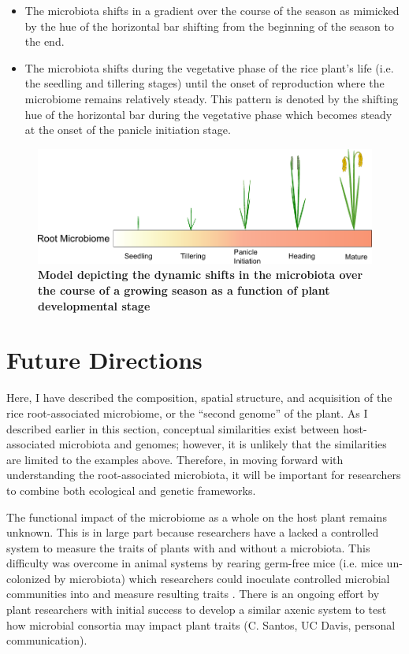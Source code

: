 \begin{itemize}
\item The microbiota shifts in a gradient over the course of the season as mimicked by the hue of the horizontal bar shifting from the beginning of the season to the end.
\item The microbiota shifts during the vegetative phase of the rice plant's life (i.e. the seedling and tillering stages) until the onset of reproduction where the microbiome remains relatively steady. This pattern is denoted by the shifting hue of the horizontal bar during the vegetative phase which becomes steady at the onset of the panicle initiation stage.
\end{itemize}

\begin{figure}[h]
\centering
\includegraphics[width=5in]{Figures/figurec_3}
\caption[Figure 5.3]{\textbf{Model depicting the dynamic shifts in the microbiota over the course of a growing season as a function of plant developmental stage}}
\label{Figure 5.3}
\end{figure}

\section{Future Directions}
Here, I have described the composition, spatial structure, and acquisition of the rice root-associated microbiome, or the ``second genome'' of the plant. As I described earlier in this section, conceptual similarities exist between host-associated microbiota and genomes; however, it is unlikely that the similarities are limited to the examples above. Therefore, in moving forward with understanding the root-associated microbiota, it will be important for researchers to combine both ecological and genetic frameworks.

The functional impact of the microbiome as a whole on the host plant remains unknown. This is in large part because researchers have a lacked a controlled system to measure the traits of plants with and without a microbiota. This difficulty was overcome in animal systems by rearing germ-free mice (i.e. mice un-colonized by microbiota) which researchers could inoculate controlled microbial communities into and measure resulting traits \cite{Turnbaugh}. There is an ongoing effort by plant researchers with initial success to develop a similar axenic system to test how microbial consortia may impact plant traits (C. Santos, UC Davis, personal communication). 

